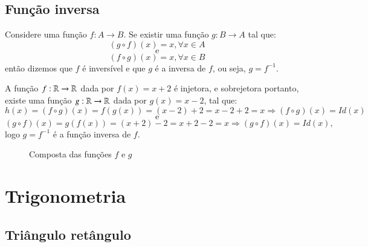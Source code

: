   \subsection{Função inversa}

Considere uma função $f: A \rightarrow B$. Se existir uma função $g: B \rightarrow A$ tal que:
\[(g \circ f)(x)= x, \forall x \in A\]
\[ \text {e}\]
\[(f \circ g)(x)= x, \forall x \in B\]
então dizemos que $f$ é inversível e que $g$ é a inversa de $f$, ou seja, $g= f^{-1}$.

\begin{exem}
 A função $f: \mathbb{R} \rightarrow \mathbb{R}$ dada por $f(x)= x+2$ é injetora, e sobrejetora portanto, existe uma função $g: \mathbb{R} \rightarrow \mathbb{R}$ dada por $g(x)= x-2$, tal que:
 \[h(x)= (f \circ g)(x)= f(g(x))= (x-2) + 2= x-2+2= x \Rightarrow (f \circ g)(x)= Id(x)\]
 \[\text{e}\]
 \[(g \circ f)(x)= g(f(x))= (x+2) - 2= x+2-2= x \Rightarrow (g \circ f)(x)= Id(x) ,\]
 logo $g= f^{-1}$ é a função inversa de $f$.

 \begin{figure}[H]
 \centering
    \caption{Composta das funções $f$ e $g$}
  \end{figure}

\end{exem}
  
  
  \section{Trigonometria}

 \subsection{Triângulo retângulo}

